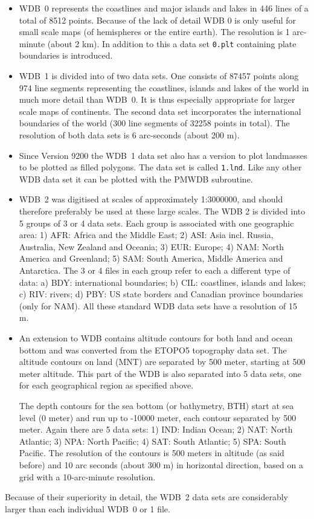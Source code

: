 \documentclass[titlepage,a4paper]{article}
\begin{document}
\begin{itemize}
\item WDB~0 represents the coastlines and major islands and lakes
    in 446 lines of a total of 8512 points. Because of the lack of detail
    WDB 0 is only useful for small scale maps (of hemispheres or the entire
    earth). The resolution is 1 arc-minute (about 2 km).
    In addition to this a data set \verb|0.plt| containing plate boundaries is introduced.
\item WDB~1 is divided into of two data sets. One consists of
    87457 points along 974 line segments representing the coastlines, islands
    and lakes of the world in much more detail than WDB~0. It is thus
    especially appropriate for larger scale maps of continents. The second
    data set incorporates the international boundaries of the world (300 line
    segments of 32258 points in total). The resolution of both data sets is
    6 arc-seconds (about 200 m).
\item Since Version 9200 the WDB~1 data set also has a version to plot
    landmasses to be plotted as filled polygons.
    The data set is called \verb|1.lnd|.
    Like any other WDB data set it can be plotted with the
    PMWDB subroutine.
\item WDB~2 was digitised at scales of approximately 1:3000000,
    and should therefore preferably be used at these large scales. The WDB 2
    is divided into 5 groups of 3 or 4 data sets. Each group is associated
    with one geographic area: 1) AFR: Africa and the Middle East; 2) ASI:
    Asia incl. Russia, Australia, New Zealand and Oceania; 3) EUR: Europe;
    4) NAM: North America and Greenland; 5) SAM: South America, Middle America
    and Antarctica. The 3 or 4 files in each group refer to each a different
    type of data: a) BDY: international boundaries; b) CIL: coastlines, islands
    and lakes; c) RIV: rivers; d) PBY: US state borders and Canadian province
    boundaries (only for NAM). All these standard WDB data sets have a
    resolution of 15 m.
\item An extension to WDB contains altitude contours for both
    land and ocean bottom and was converted from the ETOPO5 topography data set.
    The altitude contours on land (MNT) are separated by
    500 meter, starting at 500 meter altitude. This part of the WDB is also
    separated into 5 data sets, one for each geographical region as specified
    above.
    
    The depth contours for the sea bottom (or bathymetry, BTH) start at
    sea level (0 meter) and run up to -10000 meter, each contour separated by
    500 meter. Again there are 5 data sets: 1) IND: Indian Ocean; 2) NAT: North
    Atlantic; 3) NPA: North Pacific; 4) SAT: South Atlantic; 5) SPA: South
    Pacific. The resolution of the contours is 500 meters in altitude (as
    said before) and 10 arc seconds (about 300 m) in horizontal direction,
    based on a grid with a 10-arc-minute resolution.
\end{itemize}
Because of their superiority in detail, the WDB~2 data sets are considerably
larger than each individual WDB~0 or 1 file.
\end{document}

